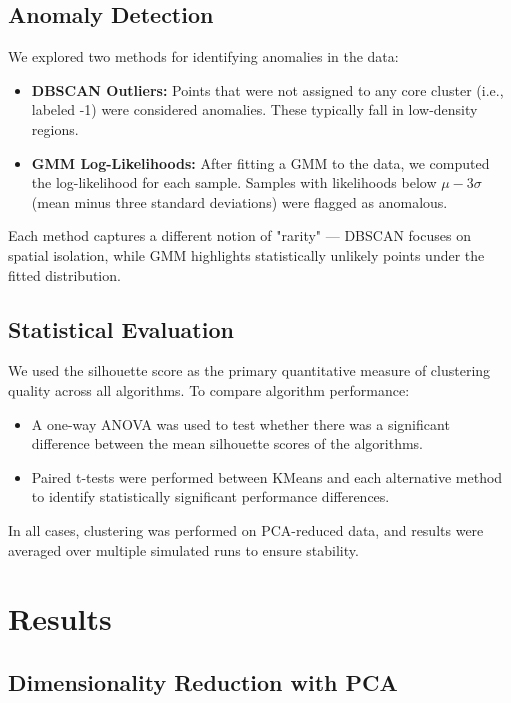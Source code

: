 \documentclass[12pt]{article}
\begin{document}
\subsection*{Anomaly Detection}

We explored two methods for identifying anomalies in the data:
\begin{itemize}
    \item \textbf{DBSCAN Outliers:} Points that were not assigned to any core cluster (i.e., labeled -1) were considered anomalies. These typically fall in low-density regions.
    \item \textbf{GMM Log-Likelihoods:} After fitting a GMM to the data, we computed the log-likelihood for each sample. Samples with likelihoods below $\mu - 3\sigma$ (mean minus three standard deviations) were flagged as anomalous.
\end{itemize}

Each method captures a different notion of "rarity" — DBSCAN focuses on spatial isolation, while GMM highlights statistically unlikely points under the fitted distribution.

\subsection*{Statistical Evaluation}

We used the silhouette score as the primary quantitative measure of clustering quality across all algorithms. To compare algorithm performance:
\begin{itemize}
    \item A one-way ANOVA was used to test whether there was a significant difference between the mean silhouette scores of the algorithms.
    \item Paired t-tests were performed between KMeans and each alternative method to identify statistically significant performance differences.
\end{itemize}
In all cases, clustering was performed on PCA-reduced data, and results were averaged over multiple simulated runs to ensure stability.

\section{Results}

\subsection*{Dimensionality Reduction with PCA}
\end{document}
